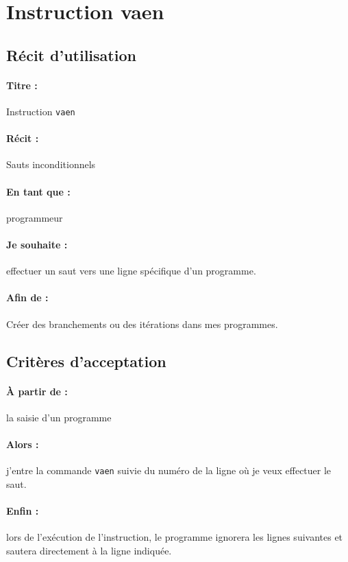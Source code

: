 \section{Instruction vaen}

    \subsection*{Récit d'utilisation}

    \paragraph{Titre : } Instruction \verb|vaen|
    \paragraph{Récit : } Sauts inconditionnels
    \paragraph{En tant que : } programmeur
    \paragraph{Je souhaite : } effectuer un saut vers une ligne
        spécifique d'un programme.
    \paragraph{Afin de : } Créer des branchements ou des itérations
        dans mes programmes.

    \subsection*{Critères d'acceptation}

    \paragraph{À partir de : } la saisie d'un programme
    \paragraph{Alors : } j'entre la commande \verb|vaen| suivie du numéro
        de la ligne où je veux effectuer le saut.
    \paragraph{Enfin : } lors de l'exécution de
    l'instruction, le programme ignorera les lignes
    suivantes et sautera directement à la ligne indiquée.